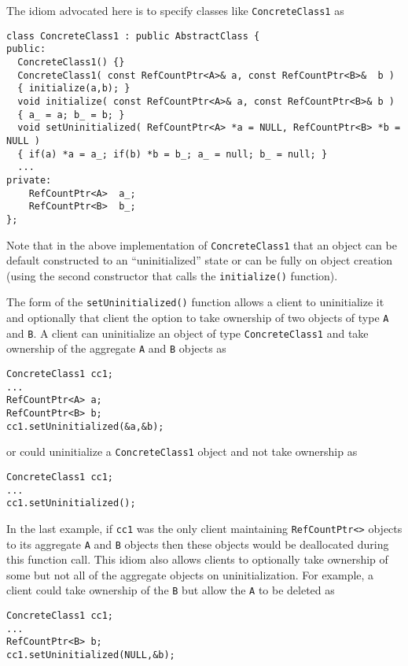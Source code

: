 The idiom advocated here is to specify classes like
{}\texttt{ConcreteClass1} as
%
{\scriptsize\begin{verbatim}
class ConcreteClass1 : public AbstractClass {
public:
  ConcreteClass1() {}
  ConcreteClass1( const RefCountPtr<A>& a, const RefCountPtr<B>&  b )
  { initialize(a,b); }
  void initialize( const RefCountPtr<A>& a, const RefCountPtr<B>& b )
  { a_ = a; b_ = b; }
  void setUninitialized( RefCountPtr<A> *a = NULL, RefCountPtr<B> *b = NULL )
  { if(a) *a = a_; if(b) *b = b_; a_ = null; b_ = null; }
  ...
private:
    RefCountPtr<A>  a_;
    RefCountPtr<B>  b_;
};
\end{verbatim}}

Note that in the above implementation of {}\texttt{ConcreteClass1}
that an object can be default constructed to an ``uninitialized''
state or can be fully on object creation (using the second constructor
that calls the {}\texttt{initialize()} function).

The form of the {}\texttt{setUninitialized()} function allows a client
to uninitialize it and optionally that client the option to take
ownership of two objects of type {}\texttt{A} and {}\texttt{B}.  A
client can uninitialize an object of type {}\texttt{Concrete\-Class1}
and take ownership of the aggregate {}\texttt{A} and {}\texttt{B}
objects as
%
{\scriptsize\begin{verbatim}
ConcreteClass1 cc1;
...
RefCountPtr<A> a;
RefCountPtr<B> b;
cc1.setUninitialized(&a,&b);
\end{verbatim}}
%
{}\noindent{}or could uninitialize a {}\texttt{Concrete\-Class1}
object and not take ownership as
%
{\scriptsize\begin{verbatim}
ConcreteClass1 cc1;
...
cc1.setUninitialized();
\end{verbatim}}
%
{}\noindent{}In the last example, if {}\texttt{cc1} was the only
client maintaining {}\texttt{RefCountPtr<>} objects to its aggregate
{}\texttt{A} and {}\texttt{B} objects then these objects would be
deallocated during this function call.  This idiom also allows clients
to optionally take ownership of some but not all of the aggregate
objects on uninitialization.  For example, a client could take
ownership of the {}\texttt{B} but allow the {}\texttt{A} to be deleted
as
%
{\scriptsize\begin{verbatim}
ConcreteClass1 cc1;
...
RefCountPtr<B> b;
cc1.setUninitialized(NULL,&b);
\end{verbatim}}
%
